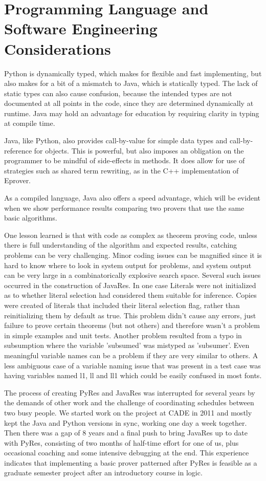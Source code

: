 \documentclass{llncs}
\begin{document}
\section{Programming Language and Software Engineering Considerations}

Python is dynamically typed, which makes for flexible and fast implementing, but also makes
for a bit of a mismatch to Java, which is statically typed.  The lack of static
types can also cause confusion, because the intended types are not
documented at all points in the code, since they are determined dynamically at
runtime.  Java may hold an advantage for education by requiring clarity in typing
at compile time.

Java, like Python, also provides call-by-value for simple data types and call-by-reference for
objects.  This is powerful, but also imposes an obligation on the programmer to
be mindful of side-effects in methods.  It does allow for use of strategies such as
shared term rewriting, as in the C++ implementation of Eprover.

As a compiled language, Java also offers a speed advantage, which will be evident
when we show performance results comparing two provers that use the same basic algorithms.

One lesson learned is that with code as complex as theorem proving code, unless there is
full understanding of the algorithm and expected results, catching problems can be very
challenging.  Minor coding issues can be magnified since it is hard to know where to
look in system output for problems, and system output can be very large in a combinatorically
explosive search space.  Several such issues occurred in the construction of JavaRes.  In one
case Literals were not initialized as to whether literal selection had considered them
suitable for inference.  Copies were created of literals that included their literal
selection flag, rather than reinitializing them by default as true.  This problem didn't cause
any errors, just failure to prove certain theorems (but not others) and therefore wasn't a
problem in simple examples and unit tests.  Another problem resulted from a typo in
subsumption where the variable 'subsumed' was mistyped as 'subsumer'.  Even meaningful
variable names can be a problem if they are very similar to others.  A less ambiguous case
of a variable naming issue that was present in a test case was having variables named l1, ll and ll1
which could be easily confused in most fonts.

The process of creating PyRes and JavaRes was interrupted for several years by the demands
of other work and the challenge of coordinating schedules between two busy people.  We started
work on the project at CADE in 2011 and mostly kept the Java and Python versions in sync, working
one day a week together.  Then there was a gap of 8 years and a final push to bring JavaRes
up to date with PyRes, consisting of two months of half-time effort for one of us, plus occasional
coaching and some intensive debugging at the end.  This experience indicates that implementing a
basic prover patterned after PyRes is feasible as a graduate semester project
after an introductory course in logic.
\end{document}
